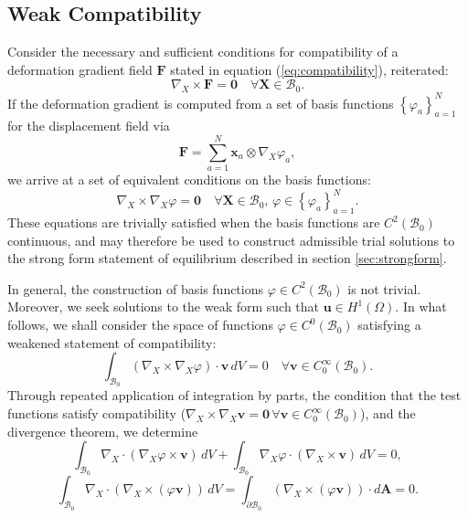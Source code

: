 \subsection*{Weak Compatibility}

Consider the necessary and sufficient conditions for compatibility of a deformation gradient field $\mathbf{F}$ stated in equation (\ref{eq:compatibility}), reiterated:
\begin{equation}
	\nabla_X \times \mathbf{F} = \mathbf{0} \quad \forall \mathbf{X} \in \mathcal{B}_0.
\end{equation}
If the deformation gradient is computed from a set of basis functions $\left\{ \varphi_a \right\}_{a=1}^N$ for the displacement field via
\begin{equation}
	\mathbf{F} = \sum_{a=1}^N \mathbf{x}_{a} \otimes \nabla_X \varphi_{a},
\end{equation}
we arrive at a set of equivalent conditions on the basis functions:
\begin{equation}
	\nabla_X \times \nabla_X \varphi = \mathbf{0} \quad \forall \mathbf{X} \in \mathcal{B}_0, \, \varphi \in \left\{ \varphi_a \right\}_{a=1}^N.
	\label{eq:strong_compatibility}
\end{equation}
These equations are trivially satisfied when the basis functions are $C^2 (\mathcal{B}_0)$ continuous, and may therefore be used to construct admissible trial solutions to the strong form statement of equilibrium described in section \ref{sec:strongform}.

In general, the construction of basis functions $\varphi \in C^2 (\mathcal{B}_0)$ is not trivial. Moreover, we seek solutions to the weak form such that $\mathbf{u} \in H^1 (\Omega)$. In what follows, we shall consider the space of functions $\varphi \in C^0 (\mathcal{B}_0)$ satisfying a weakened statement of compatibility:
\begin{equation}
	\int_{\mathcal{B}_0} (\nabla_X \times \nabla_X \varphi) \cdot \mathbf{v} \, dV = 0 \quad \forall \mathbf{v} \in C^\infty_0 (\mathcal{B}_0).
\end{equation}
Through repeated application of integration by parts, the condition that the test functions satisfy compatibility ($\nabla_X \times \nabla_X \mathbf{v} = \mathbf{0} \, \forall \mathbf{v} \in C^\infty_0 (\mathcal{B}_0)$), and the divergence theorem, we determine
 \begin{equation}
	\int_{\mathcal{B}_0} \nabla_X \cdot (\nabla_X \varphi \times \mathbf{v}) \, dV + \int_{\mathcal{B}_0} \nabla_X \varphi \cdot (\nabla_X \times \mathbf{v}) \, dV = 0,
\end{equation}
\begin{equation}
	\int_{\mathcal{B}_0} \nabla_X \cdot (\nabla_X \times (\varphi \mathbf{v})) \, dV = \int_{\partial \mathcal{B}_0} (\nabla_X \times (\varphi \mathbf{v})) \cdot d\mathbf{A} = 0.
\end{equation}

